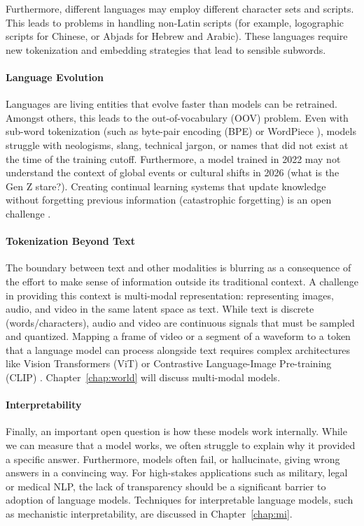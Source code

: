 Furthermore, different languages may employ different character sets and scripts. This leads to problems in handling non-Latin scripts (for example, logographic scripts for Chinese, or Abjads for  Hebrew and Arabic). These languages require new tokenization and embedding strategies that lead to sensible subwords. 

\paragraph{Language Evolution}
Languages are living entities that  evolve faster than models can be retrained. Amongst others, this leads to the out-of-vocabulary (OOV) problem. Even with sub-word tokenization (such as byte-pair encoding (BPE) \citep{gage1994new} or WordPiece \citep{song2021fast}), models struggle with neologisms, slang, technical jargon, or names that did not exist at the time of  the training cutoff. Furthermore, a model trained in 2022 may not understand the context of global events or cultural shifts in 2026 (what is the Gen Z stare?). Creating continual learning systems that update knowledge without forgetting previous information (catastrophic forgetting) is an open challenge \citep{wu2024continual}.

\paragraph{Tokenization Beyond Text}
The boundary between text and other modalities is blurring as a consequence of the effort to make sense of information outside its traditional context. A challenge in providing this context is multi-modal representation:  representing images, audio, and video in the same latent space as text. While text is discrete (words/characters), audio and video are continuous signals that must be sampled and quantized. Mapping a frame of video or a segment of a waveform to a token that a language model can process alongside text requires complex architectures like Vision Transformers (ViT) \citep{han2022survey} or Contrastive Language-Image Pre-training (CLIP) \citep{radford2021learning}. Chapter~\ref{chap:world} will discuss multi-modal models.

\paragraph{Interpretability}
Finally, an important open question is how these models work internally. While we can measure that a model works, we often struggle to explain why it provided a specific answer. Furthermore, models often fail, or hallucinate, giving wrong answers in a convincing way. For high-stakes applications such as military, legal or medical NLP, the lack of transparency should be a significant barrier to adoption of language models. Techniques for interpretable language models, such as mechanistic interpretability, are discussed in Chapter~\ref{chap:mi}. 

